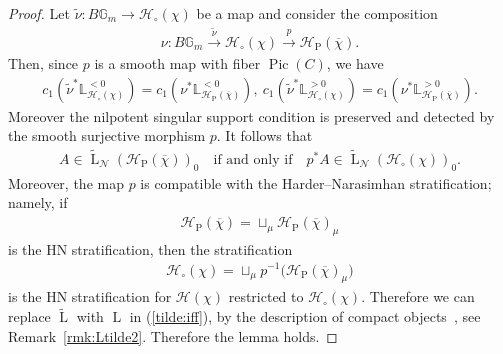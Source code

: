 \documentclass[11pt,oneside,a4paper,mathscr]{amsart}
\theoremstyle{definition}
\newcommand{\LL}{\operatorname{L}}
\newcommand{\Pic}{\operatorname{Pic}}
\newcommand{\cH}{\mathcal{H}}
\newcommand{\bgm}{B\mathbb{G}_m}
\begin{document}
\begin{proof}
Let $\widetilde{\nu} \colon \bgm \to \cH_{\circ}(\chi)$ be a map and consider the composition
\begin{align*}
\nu \colon \bgm \xrightarrow{\widetilde{\nu}} \cH_{\circ}(\chi)
\xrightarrow{p} \cH_{\mathrm{P}}(\overline{\chi}).
\end{align*}
Then, since $p$ is a smooth map with fiber $\Pic(C)$, we have
\begin{align}\label{equal:tilde}
c_1\left(\widetilde{\nu}^* \mathbb{L}_{\cH_{\circ}(\chi)}^{<0}\right)
=
c_1\left(\nu^* \mathbb{L}_{\cH_{\mathrm{P}}(\overline{\chi})}^{<0}\right), \ 
c_1\left(\widetilde{\nu}^* \mathbb{L}_{\cH_{\circ}(\chi)}^{>0}\right)
=
c_1\left(\nu^* \mathbb{L}_{\cH_{\mathrm{P}}(\overline{\chi})}^{>0}\right).
\end{align}
Moreover the nilpotent singular support condition is preserved and detected by the smooth surjective morphism $p$.
It follows that
\begin{align}\label{tilde:iff}
A \in \widetilde{\LL}_{\mathcal{N}}(\cH_{\mathrm{P}}(\overline{\chi}))_0
\quad \text{if and only if} \quad
p^*A \in \widetilde{\LL}_{\mathcal{N}}(\cH_{\circ}(\chi))_0.
\end{align}
Moreover, the map $p$ is compatible with the Harder--Narasimhan stratification; namely, if
\begin{align*}
\cH_{\mathrm{P}}(\overline{\chi})
=
\sqcup_{\mu}\cH_{\mathrm{P}}(\overline{\chi})_{\mu}
\end{align*}
is the HN stratification, then the stratification
\begin{align*}
\cH_{\circ}(\chi)
=
\sqcup_{\mu}p^{-1}\bigl(\cH_{\mathrm{P}}(\overline{\chi})_{\mu}\bigr)
\end{align*}
is the HN stratification for $\cH(\chi)$ restricted to $\cH_{\circ}(\chi)$.
Therefore we can replace $\widetilde{\LL}$ with $\LL$ in (\ref{tilde:iff}), 
by the description of compact objects~\cite[(8.65)]{PTlim}, see Remark~\ref{rmk:Ltilde2}. 
Therefore the lemma holds. 
\end{proof}
\end{document}

